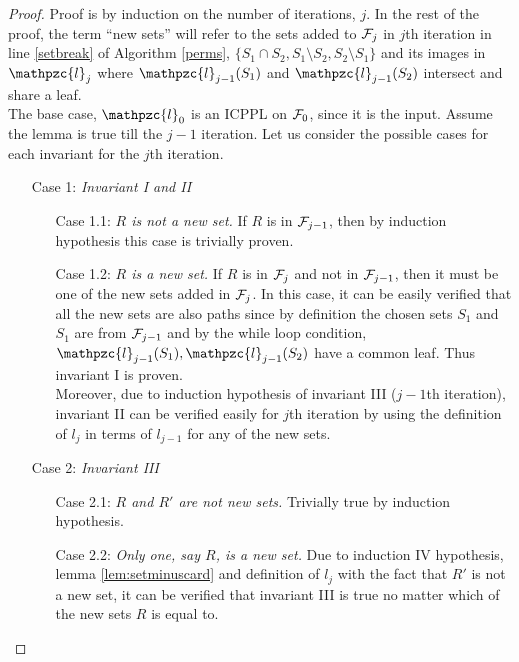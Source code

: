 \documentclass{llncs}
\def\cF{{\cal F}}
\def\cl{\mathpzc{l}}
\begin{document}
\begin{proof}
  Proof is by induction on the number of iterations, $j$. In the rest
  of the proof, the term ``new sets'' will refer to the sets added
  to $\cF_j$ in $j$th iteration in line \ref{setbreak} of Algorithm
  \ref{perms}, $\{S_1 \cap S_2, S_1 \setminus S_2, S_2 \setminus S_1
  \}$ and its images in $\cl_j$ where $\cl_{j-1}(S_1)$ and
  $\cl_{j-1}(S_2)$
  intersect and share a leaf.\\
  \noindent
  The base case, $\cl_0$ is an ICPPL on $\cF_0$, since it is the
  input.  Assume the lemma is true till the $j-1$ iteration. Let us consider
the possible cases for each invariant for the  $j$th  iteration.

  \noindent
  \begin{enumerate}
  \item [Case 1:] {\em Invariant I and II} 
    \begin{enumerate}
    \item [Case 1.1:] {\em $R$ is not a new set.} If $R$ is in
      $\cF_{j-1}$, then by induction hypothesis this case is trivially
      proven.
    \item [Case 1.2:] {\em $R$ is a new set.} If $R$ is in $\cF_{j}$
      and not in $\cF_{j-1}$, then it must be one of the new sets
      added in $\cF_j$. In this case, it can be easily verified that
      all the new sets are also paths since by definition the chosen
      sets $S_1$ and $S_1$ are from $\cF_{j-1}$ and by the while loop
      condition, $\cl_{j-1}(S_1), \cl_{j-1}(S_2)$ have a common
      leaf. Thus invariant I is proven.\\
      Moreover, due to induction hypothesis of invariant III ($j-1$th
      iteration), invariant II can be verified easily for $j$th
      iteration by using the definition of $l_j$ in terms of $l_{j-1}$
      for any of the new sets.
   \end{enumerate}
  \item [Case 2:] {\em Invariant III}
    \begin{enumerate}
    \item [Case 2.1:] {\em $R$ and $R'$ are not new sets.} Trivially
      true by induction hypothesis.
    \item [Case 2.2:] {\em Only one, say $R$, is a new set.} Due to
      induction IV hypothesis, lemma \ref{lem:setminuscard} and
      definition of $l_j$ with the fact that $R'$ is not a new set, it
      can be verified that invariant III is true no matter which of
      the new sets $R$ is equal to.

\end{enumerate}
\end{enumerate}
\end{proof}
\end{document}
